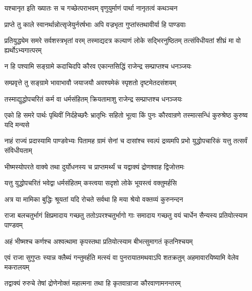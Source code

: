 \twolineshloka
{यश्चानृत इति ख्यातः स च गच्छेत्पराभवम्}
{वृणुयुर्माणं पार्था नानृतत्वं कथञ्चन}


\twolineshloka
{प्राप्ते तु काले स्वानर्थान्नोत्सृजेयुर्नरर्षभाः}
{अपि वज्रभृता गुप्तांस्तथावीर्या हि पाण्डवाः}


\onelineshloka
{प्रतियुद्ध्येम समरे सर्वशस्त्रभृतां वरम्}
\twolineshloka
{तस्माद्यदत्र कल्याणं लोके सद्भिरनुष्ठितम्}
{तत्संविधीयतां शीघ्रं मा वो ह्यर्थोऽभ्यगात्परम्}


\twolineshloka
{न हि पश्यामि सङ्ग्रामे कदाचिदपि कौरव}
{एकान्तसिद्धिं राजेन्द्र सम्प्राप्तश्च धनञ्जयः}


\twolineshloka
{सम्प्रवृत्ते तु सङ्ग्रामे भावाभावौ जयाजयौ}
{अवश्यमेकं स्पृशतो दृष्टमेतदसंशयम्}


\twolineshloka
{तस्माद्युद्धोपचरितं कर्म वा धर्मसंहितम्}
{क्रियतामाशु राजेन्द्र सम्प्राप्तश्च धनञ्जयः}


\threelineshloka
{एको हि समरे पार्थः पृथिवीं निर्दहेच्छरैः}
{भ्रातृभिः सहितो भूत्वा किं पुनः कौरवान्रणे}
{तस्मात्सन्धिं कुरुश्रेष्ठ कुरुष्व यदि मन्यसे}




\threelineshloka
{नाहं राज्यं प्रदास्यामि पाण्डवेभ्यः पितामह}
{ग्रामं सेनां च दासांश्च स्वल्पं द्रव्यमपि प्रभो}
{युद्धोपचारिकं यत्तु तत्सर्वं संविधीयताम्}



\twolineshloka
{भीष्मस्योपरते वाक्ये तथा दुर्योधनस्य च}
{प्राप्तमर्थ्यं च यद्वाक्यं द्रोणश्वाह द्विजोत्तमः}


\twolineshloka
{यत्तु युद्धोपचरितं भवेद्वा धर्मसंहितम्}
{कस्त्वया सदृशो लोके भूयस्त्वं वक्तुमर्हसि}


\twolineshloka
{अत्र या मामिका बुद्धिः श्रूयतां यदि रोचते}
{सर्वथा हि मया श्रेयो वक्तव्यं कुरुनन्दन}


\threelineshloka
{राजा बलचतुर्भागं क्षिप्रमादाय गच्छतु}
{ततोऽपरश्चतुर्भागो गाः समादाय गच्छतु}
{वयं चार्धेन सैन्यस्य प्रतियोत्स्याम पाण्डवम्}


\twolineshloka
{अहं भीष्मश्च कर्णश्च अश्वत्थामा कृपस्तथा}
{प्रतियोत्स्याम बीभत्सुमागतं कृतनिश्चयम्}


\threelineshloka
{एवं राजा सुगुप्तः स्यान्न क्लैब्यं गन्तुमर्हति}
{मत्स्यं वा पुनरायातमथवाऽपि शतक्रतुम्}
{अहमावारयिष्यामि वेलेव मकरालयम्}



\twolineshloka
{तद्वाक्यं रुरुचे तेषां द्रोणेनोक्तं महात्मना}
{तथा हि कृतवान्राजा कौरवाणामनन्तरम्}


